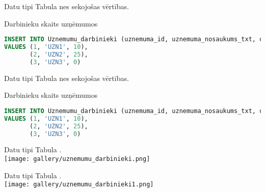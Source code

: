 \documentclass{beamer}
\begin{document}
        \begin{frame}[fragile]{Datu tipi}
        \vspace{0.5cm}
        Tabula \texttt{\color[RGB]{1, 0, 92}{Uznemumu\_darbinieki}} nes sekojošas vērtības.
        \vspace{0.5cm}
        \begin{block}{Darbinieku skaits uzņēmumos}
            \begin{lstlisting}[language=SQL]
INSERT INTO Uznemumu_darbinieki (uznemuma_id, uznemuma_nosaukums_txt, darbinieku_skaits_num)
VALUES (1, 'UZN1', 10), 
       (2, 'UZN2', 25), 
       (3, 'UZN3', 0)
    \end{lstlisting}
    \end{block}
    \end{frame}

    
        \begin{frame}[fragile]{Datu tipi}
        \vspace{0.5cm}
        Tabula \texttt{\color[RGB]{1, 0, 92}{Uznemumu\_darbinieki}} nes sekojošas vērtības.
        \vspace{0.5cm}
        \begin{block}{Darbinieku skaits uzņēmumos}
            \begin{lstlisting}[language=SQL]
INSERT INTO Uznemumu_darbinieki (uznemuma_id, uznemuma_nosaukums_txt, darbinieku_skaits_num)
VALUES (1, 'UZN1', 10), 
       (2, 'UZN2', 25), 
       (3, 'UZN3', 0)
    \end{lstlisting}
    \end{block}
    \end{frame}

    

    \begin{frame}[fragile]{Datu tipi}
   \vspace*{0.5cm}
    Tabula \texttt{\color[RGB]{1, 0, 92}{Uznemumu\_darbinieki}}.\\
    \vspace*{0.3cm}
    \texttt{[image: gallery/uznemumu\_darbinieki.png]}
    \end{frame}

        \begin{frame}[fragile]{Datu tipi}
   \vspace*{0.5cm}
    Tabula \texttt{\color[RGB]{1, 0, 92}{Uznemumu\_darbinieki}}.\\
    \vspace*{0.3cm}
    \texttt{[image: gallery/uznemumu\_darbinieki1.png]}
    \end{frame}
\end{document}

